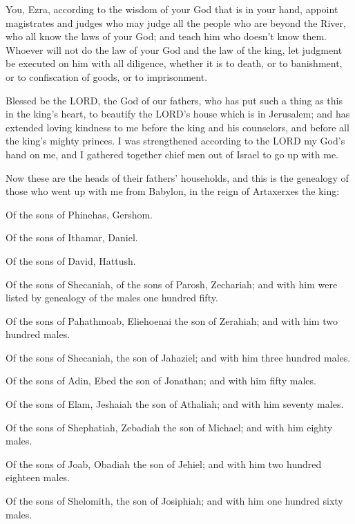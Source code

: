 \myverse{}You, Ezra, according to the wisdom of your God that
is in your hand, appoint magistrates and judges who may judge all the people who are beyond the River,
who all know the laws of your God; and teach him who doesn’t know them.
\myverse{}Whoever will not do the law of your God and the law of the king, let judgment
be executed on him with all diligence, whether it is to death, or to banishment, or to confiscation of
goods, or to imprisonment.


\vspace{\baselineskip} \myverse{}Blessed be the LORD, the God of our fathers, who has put such
a thing as this in the king’s heart, to beautify the LORD’s house which is in Jerusalem;
\myverse{}and has extended loving kindness to me before the king and his counselors,
and before all the king’s mighty princes. I was strengthened according to the LORD my God’s hand on me,
and I gathered together chief men out of Israel to go up with me.


\mychapter{} \myverse*{}Now these are the heads of their fathers’ households, and this
is the genealogy of those who went up with me from Babylon, in the reign of Artaxerxes the king:

\myverse{}Of the sons of Phinehas, Gershom.

Of the sons of Ithamar, Daniel.

Of the sons of David, Hattush.

\myverse{}Of the sons of Shecaniah, of the sons of Parosh, Zechariah;
and with him were listed by genealogy of the males one hundred fifty.

\myverse{}Of the sons of Pahathmoab, Eliehoenai the son of Zerahiah;
and with him two hundred males.

\myverse{}Of the sons of Shecaniah, the son of Jahaziel; and with
him three hundred males.

\myverse{}Of the sons of Adin, Ebed the son of Jonathan; and with
him fifty males.

\myverse{}Of the sons of Elam, Jeshaiah the son of Athaliah; and
with him seventy males.

\myverse{}Of the sons of Shephatiah, Zebadiah the son of Michael;
and with him eighty males.

\myverse{}Of the sons of Joab, Obadiah the son of Jehiel; and
with him two hundred eighteen males.

\myverse{}Of the sons of Shelomith, the son of Josiphiah; and
with him one hundred sixty males.

